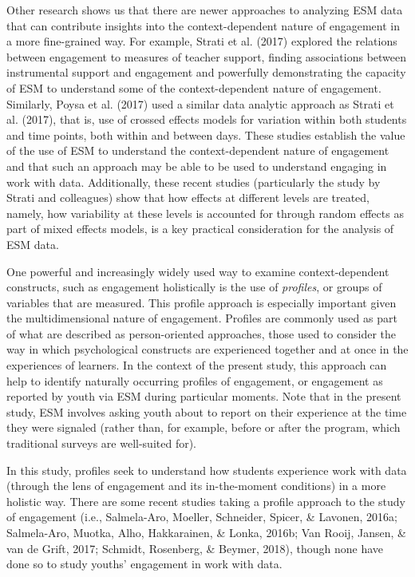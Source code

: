 \documentclass[]{book}
\theoremstyle{definition}
\theoremstyle{definition}
\theoremstyle{definition}
\theoremstyle{remark}
\begin{document}
Other research shows us that there are newer approaches to analyzing ESM
data that can contribute insights into the context-dependent nature of
engagement in a more fine-grained way. For example, Strati et al. (2017)
explored the relations between engagement to measures of teacher
support, finding associations between instrumental support and
engagement and powerfully demonstrating the capacity of ESM to
understand some of the context-dependent nature of engagement.
Similarly, Poysa et al. (2017) used a similar data analytic approach as
Strati et al. (2017), that is, use of crossed effects models for
variation within both students and time points, both within and between
days. These studies establish the value of the use of ESM to understand
the context-dependent nature of engagement and that such an approach may
be able to be used to understand engaging in work with data.
Additionally, these recent studies (particularly the study by Strati and
colleagues) show that how effects at different levels are treated,
namely, how variability at these levels is accounted for through random
effects as part of mixed effects models, is a key practical
consideration for the analysis of ESM data.

One powerful and increasingly widely used way to examine
context-dependent constructs, such as engagement holistically is the use
of \emph{profiles}, or groups of variables that are measured. This
profile approach is especially important given the multidimensional
nature of engagement. Profiles are commonly used as part of what are
described as person-oriented approaches, those used to consider the way
in which psychological constructs are experienced together and at once
in the experiences of learners. In the context of the present study,
this approach can help to identify naturally occurring profiles of
engagement, or engagement as reported by youth via ESM during particular
moments. Note that in the present study, ESM involves asking youth about
to report on their experience at the time they were signaled (rather
than, for example, before or after the program, which traditional
surveys are well-suited for).

In this study, profiles seek to understand how students experience work
with data (through the lens of engagement and its in-the-moment
conditions) in a more holistic way. There are some recent studies taking
a profile approach to the study of engagement (i.e., Salmela-Aro,
Moeller, Schneider, Spicer, \& Lavonen, 2016a; Salmela-Aro, Muotka,
Alho, Hakkarainen, \& Lonka, 2016b; Van Rooij, Jansen, \& van de Grift,
2017; Schmidt, Rosenberg, \& Beymer, 2018), though none have done so to
study youths' engagement in work with data.
\end{document}
